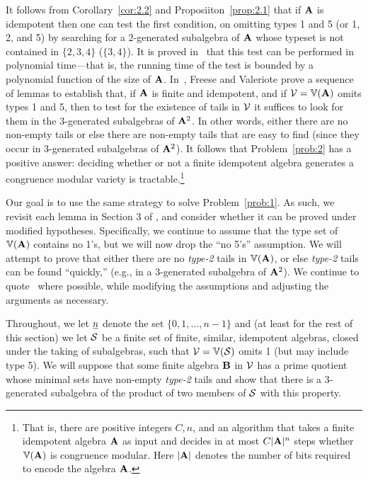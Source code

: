 It follows from Corollary~\ref{cor:2.2} and Proposiiton~\ref{prop:2.1}
that if $\mathbf{A}$ is idempotent then one can
test the first condition, on omitting types 1 and 5 (or 1, 2, and 5) by searching
for a 2-generated subalgebra of $\mathbf{A}$ whose typeset is not contained in
$\{2, 3, 4\}$ ($\{3, 4\}$). It is proved in~\cite[Sec.~6]{Freese:2009} that this
test can be performed in polynomial time---that is, the running time of the test
is bounded by a polynomial function of the size of $\mathbf{A}$.
In~\cite[Sec.~3]{Freese:2009}, Freese and Valeriote prove a sequence of
lemmas to establish that, if $\mathbf{A}$ is finite and idempotent, and if
$\mathcal{V} = \operatorname{\mathbb{V}}(\mathbf{A})$ omits types 1 and 5, then to test for the existence of tails
in $\mathcal{V}$ it suffices to look for them 
in the 3-generated subalgebras of $\mathbf{A}^2$.
In other words, either there are no non-empty tails
or else there are non-empty tails that are easy to find
(since they occur in 3-generated subalgebras of $\mathbf{A}^2$).
It follows that Problem~\ref{prob:2} has a positive answer:
deciding whether or not a finite idempotent algebra generates a congruence
modular variety is tractable.\footnote{That is, there are positive integers
  $C, n$, and an algorithm that takes
  a finite idempotent algebra $\mathbf{A}$ as input and decides
  in at most $C|\mathbf{A}|^n$ steps whether $\operatorname{\mathbb{V}}(\mathbf{A})$ is congruence modular.
  Here $|\mathbf{A}|$ denotes the number of bits required to encode the algebra $\mathbf{A}$.}

Our goal is to use the same strategy to solve Problem~\ref{prob:1}.
As such, we revisit each lemma in Section 3 of \cite{Freese:2009},
and consider whether it can be proved under modified hypotheses.
Specifically, we continue to assume that the type set of $\operatorname{\mathbb{V}}(\mathbf{A})$ contains no 1's,
but we will now drop the ``no 5's'' assumption.  We will attempt to prove that
either there are no \emph{type-2} tails in $\operatorname{\mathbb{V}}(\mathbf{A})$, or else \emph{type-2}
tails can be found ``quickly,'' (e.g., in a 3-generated subalgebra of $\mathbf{A}^2$).
We continue to quote~\cite{Freese:2009} where possible,
while modifying the assumptions and adjusting the arguments as necessary.


Throughout, we let $\underline{n}$ denote the set $\{0,1,\dots, n-1\}$ and 
(at least for the rest of this section) we let $\mathcal{S}$ be a finite set of finite,
similar, idempotent algebras, closed under the taking of subalgebras, such that
$\mathcal{V} = \operatorname{\mathbb{V}}(\mathcal{S})$ omits 1 (but may include type 5).
We will suppose that some finite algebra
$\mathbf{B}$ in $\mathcal{V}$ has a prime quotient whose minimal sets have non-empty
\emph{type-2} tails and show that there is a 3-generated subalgebra of the
product of two members of $\mathcal{S}$ with this property.

